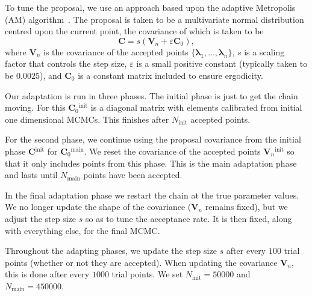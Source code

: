 \documentclass[useAMS,usedcolumn,usegraphicx,usenatbib]{mn2e}
\newcommand{\sub}[1]{\ensuremath{_\mathrm{#1}}}
\newcommand{\super}[1]{\ensuremath{^\mathrm{#1}}}
\begin{document}
To tune the proposal, we use an approach based upon the adaptive Metropolis (AM) algorithm~\citep{Haario2001}. The proposal is taken to be a multivariate normal distribution centred upon the current point, the covariance of which is taken to be
\begin{equation}
\boldsymbol{C} = s \left(\boldsymbol{V}_n + \varepsilon\boldsymbol{C}_0\right),
\end{equation}
where $\boldsymbol{V}_n$ is the covariance of the accepted points $\{\boldsymbol{\lambda}_1,\ldots,\boldsymbol{\lambda}_n\}$, $s$ is a scaling factor that controls the step size, $\varepsilon$ is a small positive constant (typically taken to be $0.0025$), and $\boldsymbol{C}_0$ is a constant matrix included to ensure ergodicity.

Our adaptation is run in three phases. The initial phase is just to get the chain moving. For this $\boldsymbol{C}_0\super{init}$ is a diagonal matrix with elements calibrated from initial one dimensional MCMCs. This finishes after $N\sub{init}$ accepted points.

For the second phase, we continue using the proposal covariance from the initial phase $\boldsymbol{C}\super{init}$ for $\boldsymbol{C}_0\super{main}$. We reset the covariance of the accepted points $\boldsymbol{V}_n\super{init}$ so that it only includes points from this phase. This is the main adaptation phase and lasts until $N\sub{main}$ points have been accepted.

In the final adaptation phase we restart the chain at the true parameter values. We no longer update the shape of the covariance ($\boldsymbol{V}_n$ remains fixed), but we adjust the step size $s$ so as to tune the acceptance rate. It is then fixed, along with everything else, for the final MCMC.

Throughout the adapting phases, we update the step size $s$ after every $100$ trial points (whether or not they are accepted). When updating the covariance $\boldsymbol{V}_n$, this is done after every $1000$ trial points. We set $N\sub{init} = 50000$ and $N\sub{main} = 450000$.
\end{document}
